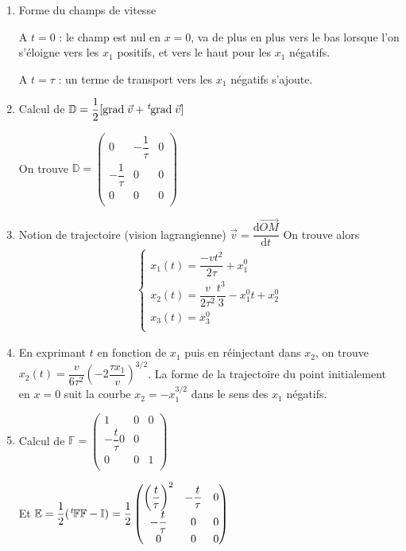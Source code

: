 \documentclass{article}
\newcommand{\deriv}{\mathrm{d}}
\newcommand{\grad}{\text{grad}\;}
\newcommand{\transpose}{\hspace{.1em}{}^t\hspace{-.1em}}
\begin{document}
\begin{enumerate}
\item Forme du champs de vitesse

A $t=0$ : le champ est nul en $x=0$, va de plus en plus vers le bas lorsque l'on s'éloigne vers les $x_1$ positifs, et vers le haut pour les $x_1$ négatifs.

A $t=\tau$ : un terme de transport vers les $x_1$ négatifs s'ajoute.

\item Calcul de $\mathbb{D}=\dfrac{1}{2}[\grad \vec{v} +\transpose \grad \vec{v}]$


On trouve $\mathbb{D} = \begin{pmatrix}
0 & -\dfrac{1}{\tau} & 0\\
- \dfrac{1}{\tau} & 0 & 0\\
0 & 0 & 0\\
\end{pmatrix}
$


\item Notion de trajectoire (vision lagrangienne)
$\vec{v} = \dfrac{\deriv \overrightarrow{OM}}{\deriv t}$
On trouve alors
\begin{align*}
\begin{cases}
x_1(t) = \dfrac{-vt^2}{2 \tau} + x^0_1\\
x_2(t) = \dfrac{v}{2\tau^2}\dfrac{t^3}{3}- x^0_1 t + x^0_2\\
x_3(t) = x_3^0\\
\end{cases}
\end{align*}

\item En exprimant $t$ en fonction de $x_1$ puis en réinjectant dans $x_2$, on trouve $x_2(t) = \dfrac{v}{6\tau^2} \left( -2 \dfrac{\tau x_1}{v}\right)^{3/2}$. La forme de la trajectoire du point initialement en $x=0$ suit la courbe $x_2=-x_1^{3/2}$ dans le sens des $x_1$ négatifs.

\item Calcul de $\mathbb{F} = 
\begin{pmatrix}
1 & 0 & 0\\
-\dfrac{t}{\tau} 0 & 0\\
0 & 0 & 1\\
\end{pmatrix}$

Et $\mathbb{E} =
\dfrac{1}{2}(\transpose \mathbb{F} \mathbb{F}-\mathbb{I}) = \dfrac{1}{2} \begin{pmatrix}
\left( \dfrac{t}{\tau}\right)^2 & - \dfrac{t}{\tau} & 0\\
-\dfrac{t}{\tau} & 0 & 0\\
0 & 0 & 0\\
\end{pmatrix}$


\end{enumerate}
\end{document}
